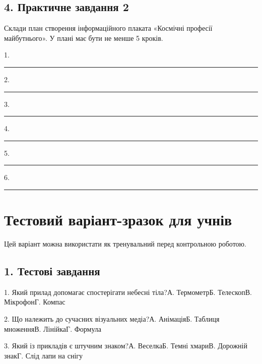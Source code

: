 \documentclass[11pt,a4paper]{article}
\begin{document}
\subsection*{4. Практичне завдання 2}

Склади план створення інформаційного плаката «Космічні професії майбутнього». У плані має бути не менше 5 кроків.\par

1. \rule{0.65\linewidth}{0.4pt}\par

2. \rule{0.65\linewidth}{0.4pt}\par

3. \rule{0.65\linewidth}{0.4pt}\par

4. \rule{0.65\linewidth}{0.4pt}\par

5. \rule{0.65\linewidth}{0.4pt}\par

6. \rule{0.65\linewidth}{0.4pt}\par

\newpage

\section*{Тестовий варіант-зразок для учнів}

Цей варіант можна використати як тренувальний перед контрольною роботою.\par

\subsection*{1. Тестові завдання}

1. Який прилад допомагає спостерігати небесні тіла?\newline А. Термометр\newline Б. Телескоп\newline В. Мікрофон\newline Г. Компас\par

2. Що належить до сучасних візуальних медіа?\newline А. Анімація\newline Б. Таблиця множення\newline В. Лінійка\newline Г. Формула\par

3. Який із прикладів є штучним знаком?\newline А. Веселка\newline Б. Темні хмари\newline В. Дорожній знак\newline Г. Слід лапи на снігу\par
\end{document}
